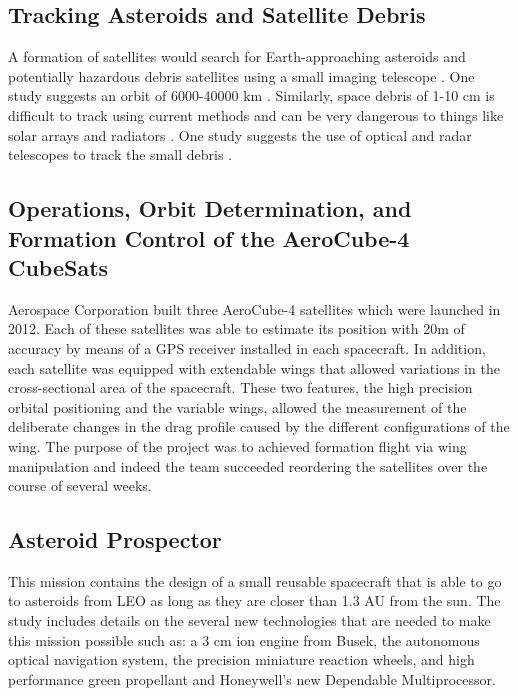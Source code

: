 \subsection{Tracking Asteroids and Satellite Debris }
\label{track_ast}

A formation of satellites would search for Earth-approaching asteroids and potentially hazardous debris satellites using a small imaging telescope \cite{Ref:Carroll}. One study suggests an orbit of 6000-40000 km \cite{Ref:Leitch}. Similarly, space debris of 1-10 cm is difficult to track using current methods and can be very dangerous to things like solar arrays and radiators \cite{Ref:Guerrero}. One study suggests the use of optical and radar telescopes to track the small debris \cite{Ref:Tolkachev}.

\subsection{Operations, Orbit Determination, and Formation Control of the AeroCube-4 CubeSats}
\label{aerocube}

Aerospace Corporation built three AeroCube-4 satellites which were launched in 2012. Each of these satellites was able
to estimate its position with 20m of accuracy by means of a GPS receiver
installed in each spacecraft. In addition, each satellite was equipped
with extendable wings that allowed variations in the cross-sectional
area of the spacecraft. These two features, the high precision orbital
positioning and the variable wings, allowed the measurement of the deliberate
changes in the drag profile caused by the different configurations
of the wing. The purpose of the project was to achieved formation
flight via wing manipulation and indeed the team succeeded reordering
the satellites over the course of several weeks.\cite{Gangestad_FF_AeroForces}

\subsection{Asteroid Prospector}
\label{ast_prospect}

This mission contains the design of a small reusable spacecraft that
is able to go to asteroids from LEO as long as they are closer than
1.3 AU from the sun. The study includes details on the several new
technologies that are needed to make this mission possible such as:
a 3 cm ion engine from Busek, the autonomous optical navigation system,
the precision miniature reaction wheels, and high performance green
propellant and Honeywell's new Dependable Multiprocessor.\cite{Muelle_AsteroidProspector}

